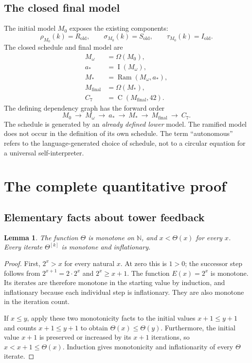 \documentclass[11pt,letterpaper]{article}
\newtheorem{lemma}[theorem]{Lemma}
\theoremstyle{definition}
\newcommand{\N}{\mathbb N}
\newcommand{\Ram}{\operatorname{Ram}}
\newcommand{\Val}{\operatorname{C}}
\newcommand{\idx}{\operatorname{I}}
\newcommand{\Iter}[2]{#1^{[#2]}}
\begin{document}
\subsection{The closed final model}

The initial model $M_0$ exposes the existing components:
\begin{equation}\label{eq:base}
 \rho_{M_0}(k)=R_{\mathrm{old}},\qquad
 \sigma_{M_0}(k)=S_{\mathrm{old}},\qquad
 \tau_{M_0}(k)=I_{\mathrm{old}}.
\end{equation}
The closed schedule and final model are
\begin{equation}\label{eq:final}
 \begin{aligned}
 M_\omega&=\Omega(M_0),\\
 a_*&=\idx(M_\omega),\\
 M_*&=\Ram(M_\omega,a_*),\\
 M_{\mathrm{final}}&=\Omega(M_*),\\
 C_7&=\Val(M_{\mathrm{final}},42).
 \end{aligned}
\end{equation}
The defining dependency graph has the forward order
\[
 M_0\ \longrightarrow\ M_\omega\ \longrightarrow\ a_*
 \ \longrightarrow\ M_*\ \longrightarrow\ M_{\mathrm{final}}
 \ \longrightarrow\ C_7.
\]
The schedule is generated by an \emph{already defined lower} model. The
ramified model does not occur in the definition of its own schedule. The term
``autonomous'' refers to the language-generated choice of schedule, not to a
circular equation for a universal self-interpreter.

\section{The complete quantitative proof}
\label{sec:quantitative}

\subsection{Elementary facts about tower feedback}

\begin{lemma}\label{lem:theta-properties}
The function $\Theta$ is monotone on $\N$, and $x<\Theta(x)$ for every $x$.
Every iterate $\Iter\Theta k$ is monotone and inflationary.
\end{lemma}
\begin{proof}
First, $2^x>x$ for every natural $x$. At zero this is $1>0$; the successor
step follows from $2^{x+1}=2\cdot2^x$ and $2^x\ge x+1$.
The function $E(x)=2^x$ is monotone. Its iterates are therefore monotone in
the starting value by induction, and inflationary because each individual
step is inflationary. They are also monotone in the iteration count.

If $x\le y$, apply these two monotonicity facts to the initial values
$x+1\le y+1$ and counts $x+1\le y+1$ to obtain
$\Theta(x)\le\Theta(y)$. Furthermore, the initial value $x+1$ is preserved or
increased by its $x+1$ iterations, so $x<x+1\le\Theta(x)$.
Induction gives monotonicity and inflationarity of every $\Theta$ iterate.
\end{proof}
\end{document}
